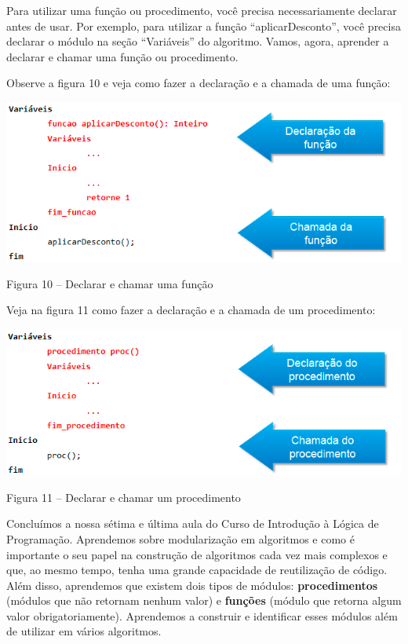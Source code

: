 \documentclass[11pt]{article}
\begin{document}
Para utilizar uma função ou procedimento, você precisa necessariamente declarar antes de usar. Por exemplo, para utilizar a função “aplicarDesconto”, você precisa declarar o módulo na seção “Variáveis” do algoritmo. Vamos, agora, aprender a declarar e chamar uma função ou procedimento.

Observe a figura 10 e veja como fazer a declaração e a chamada de uma função:

\begin{center}

\includegraphics[width=.9\linewidth]{figura11.png}

\caption{Figura 10 – Declarar e chamar uma função}

\end{center}


Veja na figura 11 como fazer a declaração e a chamada de um procedimento:

\begin{center}

\includegraphics[width=.9\linewidth]{figura12.png}

\caption{Figura 11 – Declarar e chamar um procedimento}

\end{center}

Concluímos a nossa sétima e última aula do Curso de Introdução à Lógica de Programação. Aprendemos sobre modularização em algoritmos e como é importante o seu papel na construção de algoritmos cada vez mais complexos e que, ao mesmo tempo, tenha uma grande capacidade de reutilização de código. Além disso, aprendemos que existem dois tipos de módulos: \textbf{procedimentos} (módulos que não retornam nenhum valor) e \textbf{funções} (módulo que retorna algum valor obrigatoriamente). Aprendemos a construir e identificar esses módulos além de utilizar em vários algoritmos.
\end{document}
